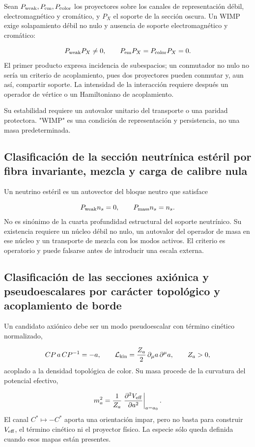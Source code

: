 Sean \(P_{\rm weak},P_{\rm em},P_{\rm color}\) los proyectores sobre los canales de representación débil, electromagnético y cromático, y \(P_X\) el soporte de la sección oscura. Un WIMP exige solapamiento débil no nulo y ausencia de soporte electromagnético y cromático:

\[
P_{\rm weak}P_X\ne0,
\qquad
P_{\rm em}P_X=P_{\rm color}P_X=0.
\]
El primer producto expresa incidencia de subespacios; un conmutador no nulo no sería un criterio de acoplamiento, pues dos proyectores pueden conmutar y, aun así, compartir soporte. La intensidad de la interacción requiere después un operador de vértice o un Hamiltoniano de acoplamiento.

Su estabilidad requiere un autovalor unitario del transporte o una paridad protectora. "WIMP" es una condición de representación y persistencia, no una masa predeterminada.

\subsection{Clasificación de la sección neutrínica estéril por fibra invariante, mezcla y carga de calibre nula}
Un neutrino estéril es un autovector del bloque neutro que satisface

\[
P_{\rm weak}n_s=0,
\qquad
P_{\rm mass}n_s=n_s.
\]
No es sinónimo de la cuarta profundidad estructural del soporte neutrínico. Su existencia requiere un núcleo débil no nulo, un autovalor del operador de masa en ese núcleo y un transporte de mezcla con los modos activos. El criterio es operatorio y puede falsarse antes de introducir una escala externa.

\subsection{Clasificación de las secciones axiónica y pseudoescalares por carácter topológico y acoplamiento de borde}
Un candidato axiónico debe ser un modo pseudoescalar con término cinético normalizado,

\[
CP\,a\,CP^{-1}=-a,
\qquad
\mathcal L_{\rm kin}=\frac{Z_a}{2}\,\partial_\mu a\,\partial^\mu a,
\qquad Z_a>0,
\]
acoplado a la densidad topológica de color. Su masa procede de la curvatura del potencial efectivo,

\[
m_a^2=\frac1{Z_a}
\left.
\frac{\partial^2V_{\rm eff}}{\partial a^2}
\right|_{a=a_0}.
\]
El canal \(C^*\mapsto-C^*\) aporta una orientación impar, pero no basta para construir \(V_{\rm eff}\), el término cinético ni el proyector físico. La especie sólo queda definida cuando esos mapas están presentes.

